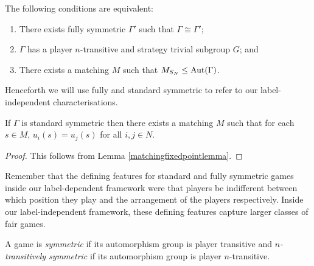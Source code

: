 \begin{corollary}  \label{indchar2}
	The following conditions are equivalent:
	\begin{enumerate}
		\item There exists fully symmetric $\Gamma'$ such that $\Gamma \cong \Gamma'$;
		\item $\Gamma$ has a player $n$-transitive and strategy trivial subgroup $G$; and
		\item There exists a matching $M$ such that $M_{S_N} \leq \operatorname*{Aut}(\Gamma)$.
	\end{enumerate}
\end{corollary}

Henceforth we will use fully and standard symmetric to refer to our label-independent characterisations. 

\begin{corollary}
	If $\Gamma$ is standard symmetric then there exists a matching $M$ such that for each $s \in M$, $u_i(s) = u_j(s)$ for all $i, j \in N$.
	\begin{proof}
		This follows from Lemma \ref{matchingfixedpointlemma}.
	\end{proof}
\end{corollary}

Remember that the defining features for standard and fully symmetric games inside our label-dependent framework were that players be indifferent between which position they play and the arrangement of the players respectively. Inside our label-independent framework, these defining features capture larger classes of fair games.

\begin{definition}
	A game is \textit{symmetric} \cite{NoahXE} if its automorphism group is player transitive and \textit{$n$-transitively symmetric} if its automorphism group is player $n$-transitive.
\end{definition}

